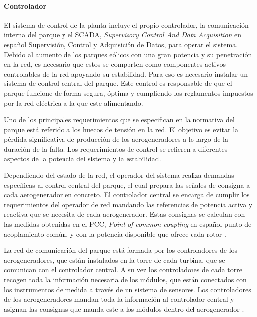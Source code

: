 \documentclass{book}
\begin{document}
		\paragraph {Controlador}
		El sistema de control de la planta incluye el propio controlador, la comunicaci\'on interna del parque y el SCADA, \emph{Supervisory Control And Data Acquisition} en español Supervisi\'on, Control y Adquisici\'on de Datos, para operar el sistema. Debido al aumento de los parques e\'olicos con una gran potencia y su penetraci\'on en la red, es necesario que estos se comporten como componentes activos controlables de la red apoyando su estabilidad. Para eso es necesario instalar un sistema de control central del parque. Este control es responsable de que el parque funcione de forma segura, \'optima y cumpliendo los reglamentos impuestos por la red el\'ectrica a la que este alimentando. \par
		Uno de los principales requerimientos que se especifican en la normativa del parque est\'a referido a los huecos de tensi\'on en la red. El objetivo es evitar la p\'erdida significativa de producci\'on de los aerogeneradores a lo largo de la duraci\'on de la falta. Los requerimientos de control se refieren a diferentes aspectos de la potencia del sistema y la estabilidad. \par 
		Dependiendo del estado de la red, el operador del sistema realiza demandas espec\'ificas al control central del parque, el cual prepara las señales de consigna a cada aerogenerador en concreto. El controlador central se encarga de cumplir los requerimientos del operador de red mandando las referencias de potencia activa y reactiva que se necesita de cada aerogenerador. Estas consignas se calculan con las medidas obtenidas en el PCC, \emph{Point of common coupling} en español punto de acoplamiento com\'un, y con la potencia disponible que ofrece cada rotor \cite{WindFarmController}.  \par
		La red de comunicaci\'on del parque est\'a formada por los controladores de los aerogeneradores, que est\'an instalados en la torre de cada turbina, que se comunican con el controlador central.  A su vez los controladores de cada torre recogen toda la informaci\'on necesaria de los m\'odulos, que est\'an conectados con los instrumentos de medida a trav\'es de  un sistema de sensores. Los controladores de los aerogeneradores mandan toda la informaci\'on al controlador central y asignan las consignas que manda este a los m\'odulos dentro del aerogenerador \cite{ComunicationControl}.  \par
\end{document}
